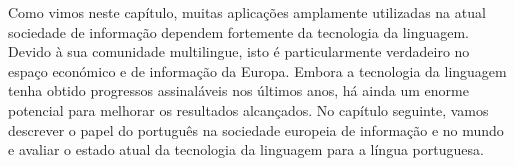 \begin{multicols}{2}

Como vimos neste capítulo, muitas aplicações amplamente utilizadas na atual sociedade de informação dependem fortemente da tecnologia da linguagem. Devido à sua comunidade multilingue, isto é particularmente verdadeiro no espaço económico e de informação da Europa. Embora a tecnologia da linguagem tenha obtido progressos assinaláveis nos últimos anos, há ainda um enorme potencial para melhorar os resultados alcançados. No capítulo seguinte, vamos descrever o papel do português na sociedade europeia de informação e no mundo e avaliar o estado atual da tecnologia da linguagem para a língua portuguesa.

\end{multicols}

\clearpage



